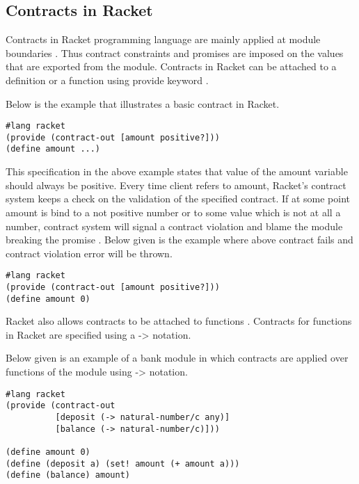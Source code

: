 \subsection{Contracts in Racket}

Contracts in Racket programming language are mainly applied at module boundaries \cite{RacketContracts}. Thus contract constraints and promises are imposed on the values that are exported from the module. Contracts in Racket can be attached to a definition or a function using provide keyword \cite{RacketContracts}.

\begin{minipage}{\linewidth}
Below is the example that illustrates a basic contract in Racket.
\lstset{caption=Basic contract example in Racket, captionpos=b, breaklines=true}       
\begin{lstlisting}[frame=single]
#lang racket
(provide (contract-out [amount positive?])) 
(define amount ...)
\end{lstlisting}
\end{minipage}

This specification in the above example states that value of the amount variable should always be positive. Every time client refers to amount, Racket's contract system keeps a check on the validation of the specified contract. If at some point amount is bind to a not positive number or to some value which is not at all a number, contract system will signal a contract violation and blame the module breaking the promise \cite{RacketContracts}. Below given is the example where above contract fails and contract violation error will be thrown. \linebreak

\begin{minipage}{\linewidth}
\lstset{caption=Contract violation example in Racket, captionpos=b, breaklines=true}       
\begin{lstlisting}[frame=single]
#lang racket
(provide (contract-out [amount positive?])) 
(define amount 0)
\end{lstlisting}
\end{minipage}

Racket also allows contracts to be attached to functions \cite{RacketContractsFunc}. Contracts for functions in Racket are specified using a -> notation. 
\begin{minipage}{\linewidth}
Below given is an example of a bank module in which contracts are applied over functions of the module using -> notation.
\lstset{caption=Contract over functions in Racket, captionpos=b, breaklines=true}       
\begin{lstlisting}[frame=single]
#lang racket
(provide (contract-out
          [deposit (-> natural-number/c any)]
          [balance (-> natural-number/c)]))

(define amount 0)
(define (deposit a) (set! amount (+ amount a)))
(define (balance) amount)

\end{lstlisting}
\end{minipage}

